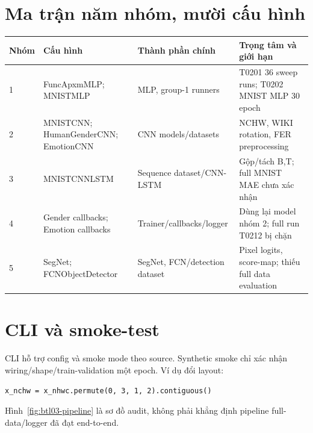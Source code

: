 \section{Ma trận năm nhóm, mười cấu hình}
\begin{longtable}{p{}p{}p{}p{}}
\toprule Nhóm & Cấu hình & Thành phần chính & Trọng tâm và giới hạn \\
\midrule
1 & FuncApxmMLP; MNISTMLP & MLP, group-1 runners & T0201 36 sweep runs; T0202 MNIST MLP 30 epoch \\
2 & MNISTCNN; HumanGenderCNN; EmotionCNN & CNN models/datasets & NCHW, WIKI rotation, FER preprocessing \\
3 & MNISTCNNLSTM & Sequence dataset/CNN-LSTM & Gộp/tách B,T; full MNIST MAE chưa xác nhận \\
4 & Gender callbacks; Emotion callbacks & Trainer/callbacks/logger & Dùng lại model nhóm 2; full run T0212 bị chặn \\
5 & SegNet; FCNObjectDetector & SegNet, FCN/detection dataset & Pixel logits, score-map; thiếu full data evaluation \\
\bottomrule
\end{longtable}

\section{CLI và smoke-test}
CLI hỗ trợ config và smoke mode theo source. Synthetic smoke chỉ xác nhận wiring/shape/train-validation một epoch. Ví dụ đổi layout:
\begin{lstlisting}[style=python,caption={Đổi layout tensor ảnh}]
x_nchw = x_nhwc.permute(0, 3, 1, 2).contiguous()
\end{lstlisting}
Hình~\ref{fig:btl03-pipeline} là sơ đồ audit, không phải khẳng định pipeline full-data/logger đã đạt end-to-end.